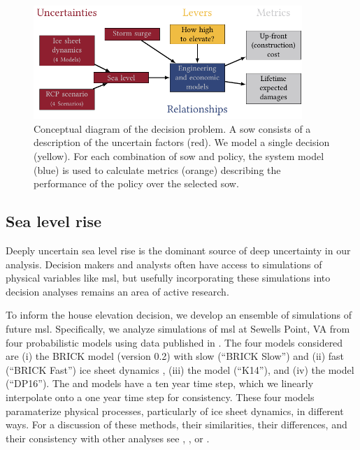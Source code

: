 \documentclass[12pt]{article}
\begin{document}
\begin{figure}
    \centering
    \includegraphics[width=4in]{xlrm.pdf}
    \caption{
        Conceptual diagram of the decision problem.
        A \gls{sow} consists of a description of the uncertain factors (red).
        We model a single decision (yellow).
        For each combination of \gls{sow} and policy, the system model (blue) is used to calculate metrics (orange) describing the performance of the policy over the selected \gls{sow}.
    }\label{fig:xlrm}
\end{figure}

\subsection{Sea level rise}\label{sec:sea-level}

Deeply uncertain sea level rise is the dominant source of deep uncertainty in our analysis.
Decision makers and analysts often have access to simulations of physical variables like \gls{msl}, but usefully incorporating these simulations into decision analyses remains an area of active research.

To inform the house elevation decision, we develop an ensemble of simulations of future \gls{msl}.
Specifically, we analyze simulations of \gls{msl} at Sewells Point, VA from four probabilistic models using data published in \citet{ruckert_coastal:2019}.
The four models considered are (i) the BRICK model (version 0.2) with slow (``BRICK Slow'') and (ii) fast (``BRICK Fast'') ice sheet dynamics \citep{wong_brick0.2:2017}, (iii) the \citet{kopp_probabilistic:2014} model (``K14''), and (iv) the \citet{deconto_antarctica:2016} model (``DP16'').
The \citet{kopp_probabilistic:2014} and \citet{deconto_antarctica:2016} models have a ten year time step, which we linearly interpolate onto a one year time step for consistency.
These four models paramaterize physical processes, particularly of ice sheet dynamics, in different ways.
For a discussion of these methods, their similarities, their differences, and their consistency with other analyses see \citet{ruckert_coastal:2019}, \citet{kopp_evolving:2017}, or \citet{bamber_slrise:2019}.
\end{document}
